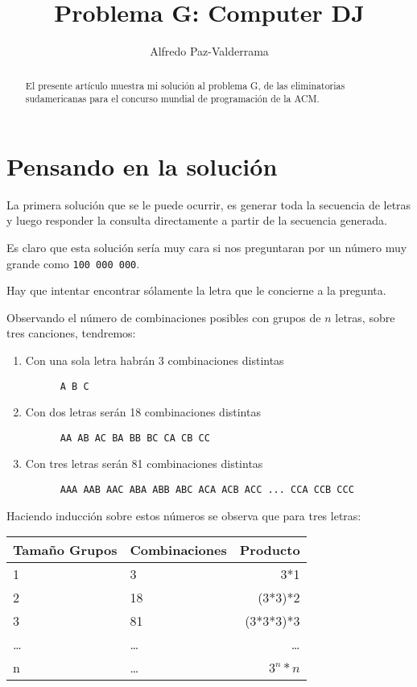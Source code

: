 \documentclass[a4paper,12pt]{article}
\title{Problema G: Computer DJ}
\author{Alfredo Paz-Valderrama}
\date{}
\begin{document}
\maketitle
\begin{abstract}
El presente artículo muestra mi solución al problema G, de las eliminatorias sudamericanas para el concurso mundial de programación de la ACM.
\end{abstract}

\section{Pensando en la solución}
La primera solución que se le puede ocurrir, es generar toda la secuencia de letras y luego responder la consulta directamente a partir de la secuencia generada. 

Es claro que esta solución sería muy cara si nos preguntaran por un número muy grande como \verb|100 000 000|.

Hay que intentar encontrar sólamente la letra que le concierne a la pregunta.

Observando el número de combinaciones posibles con grupos de $n$ letras, sobre tres canciones, tendremos:

\begin{enumerate}
   \item Con una sola letra habrán 3 combinaciones distintas
      \begin{verbatim}
      A B C
      \end{verbatim}

   \item Con dos letras serán 18 combinaciones distintas
      \begin{verbatim}
      AA AB AC BA BB BC CA CB CC
      \end{verbatim}

   \item Con tres letras serán 81 combinaciones distintas
      \begin{verbatim}
      AAA AAB AAC ABA ABB ABC ACA ACB ACC ... CCA CCB CCC
      \end{verbatim}
\end{enumerate}

Haciendo inducción sobre estos números se observa que para tres letras:

\begin{center}
\begin{tabular}{|l|l|r|}
\hline
Tamaño Grupos & Combinaciones & Producto \\ \hline
\hline
1 & 3 & 3*1 \\ \hline
2 & 18 & (3*3)*2 \\ \hline
3 & 81 & (3*3*3)*3 \\ 
\ldots&\ldots&\ldots\\ \hline
n & \ldots & $3^n*n$ \\ \hline
\end{tabular}
\end{center}
\end{document}
